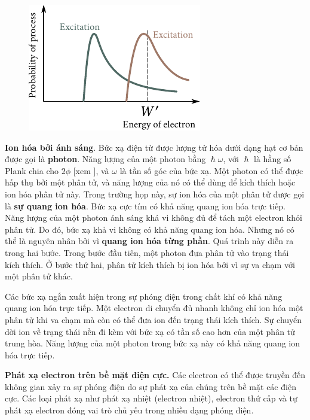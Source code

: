 \begin{figure}[t]
	\begin{center}
		\includegraphics[scale=1]{figures/ch_12/fig_12_6.pdf}
		\caption[]{}
		\label{fig:12_6}
	\end{center}
	\vspace{-0.8cm}
\end{figure}

\textbf{Ion hóa bởi ánh sáng}. Bức xạ điện từ được lượng tử hóa dưới dạng hạt cơ bản được gọi là \textbf{photon}.
Năng lượng của một photon bằng $\hslash\omega$, với $\hslash$ là hằng số Plank chia cho $2\phi$ [xem ], và $\omega$ là tần số góc của bức xạ.
Một photon có thể được hấp thụ bởi một phân tử, và năng lượng của nó có thể dùng để kích thích hoặc ion hóa phân tử này.
Trong trường họp này, sự ion hóa của một phân tử được gọi là \textbf{sự quang ion hóa}.
Bức xạ cực tím có khả năng quang ion hóa trực tiếp.
Năng lượng của một photon ánh sáng khả vi không đủ để tách một electron khỏi phân tử.
Do đó, bức xạ khả vi không có khả năng quang ion hóa.
Nhưng nó có thể là nguyên nhân bởi vì \textbf{quang ion hóa từng phần}.
Quá trình này diễn ra trong hai bước.
Trong bước đầu tiên, một photon đưa phân tử vào 
trạng thái kích thích.
Ở bước thứ hai, phân tử kích thích bị ion hóa bởi vì sự va chạm với một phân tử khác.

Các bức xạ ngắn xuất hiện trong sự phóng điện trong chất khí có khả năng quang ion hóa trực tiếp.
Một electron di chuyển đủ nhanh không chỉ ion hóa một phân tử khi va chạm mà còn có thể đưa ion đến trạng thái kích thích.
Sự chuyển dời ion về trạng thái nền đi kèm với bức xạ có tần số cao hơn của một phân tử trung hòa.
Năng lượng của một photon trong bức xạ này có khả năng quang ion hóa trực tiếp.

\textbf{Phát xạ electron trên bề mặt điện cực.} Các electron có thể được truyền đến không gian xảy ra sự phóng điện do sự phát xạ của chúng trên bề mặt các điện cực.
Các loại phát xạ như phát xạ nhiệt (electron nhiệt), electron thứ cấp và tự phát xạ electron đóng vai trò chủ yếu trong nhiều dạng phóng điện.

